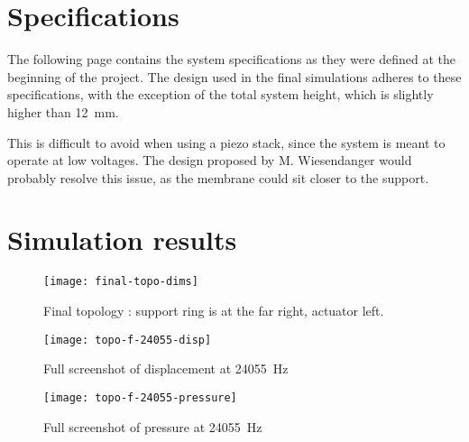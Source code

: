 \section{Specifications}
\label{sec:specs}

The following page contains the system specifications as they were defined at
the beginning of the project. The design used in the final simulations adheres
to these specifications, with the exception of the total system height, which is
slightly higher than \SI{12}{\milli\metre}.

This is difficult to avoid when using a piezo stack, since the system is meant
to operate at low voltages. The design proposed by M. Wiesendanger
\cite{wiesendanger2001} would probably resolve this issue, as the membrane could
sit closer to the support.



\section{Simulation results}
\label{sec:simulation-results}

\begin{figure}[!h]
  \begin{center}
    \texttt{[image: final-topo-dims]}
  \end{center}
  \caption{Final topology : support ring is at the far right, actuator left.}
  \label{fig:final-overview}
\end{figure}

\begin{figure}[!h]
  \begin{center}
    \texttt{[image: topo-f-24055-disp]}
  \end{center}
  \caption{Full screenshot of displacement at \SI{24055}{\hertz}}
  \label{fig:full-displacement}
\end{figure}

\begin{figure}[!h]
  \begin{center}
    \texttt{[image: topo-f-24055-pressure]}
  \end{center}
  \caption{Full screenshot of pressure at \SI{24055}{\hertz}}
  \label{fig:full-pressure}
\end{figure}
